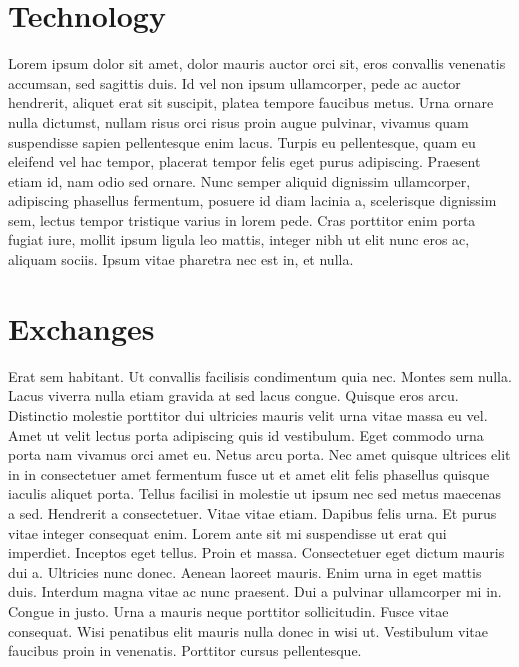 \documentclass[letterpaper,10pt,openany,oneside,english]{sphinxmanual}
\begin{document}
\section{Technology}
\label{\detokenize{technology:technology}}\label{\detokenize{technology::doc}}
Lorem ipsum dolor sit amet, dolor mauris auctor orci sit, eros convallis venenatis accumsan, sed sagittis duis. Id vel non ipsum ullamcorper, pede ac auctor hendrerit, aliquet erat sit suscipit, platea tempore faucibus metus. Urna ornare nulla dictumst, nullam risus orci risus proin augue pulvinar, vivamus quam suspendisse sapien pellentesque enim lacus. Turpis eu pellentesque, quam eu eleifend vel hac tempor, placerat tempor felis eget purus adipiscing. Praesent etiam id, nam odio sed ornare. Nunc semper aliquid dignissim ullamcorper, adipiscing phasellus fermentum, posuere id diam lacinia a, scelerisque dignissim sem, lectus tempor tristique varius in lorem pede. Cras porttitor enim porta fugiat iure, mollit ipsum ligula leo mattis, integer nibh ut elit nunc eros ac, aliquam sociis. Ipsum vitae pharetra nec est in, et nulla.


\section{Exchanges}
\label{\detokenize{exchanges:exchanges}}\label{\detokenize{exchanges::doc}}
Erat sem habitant. Ut convallis facilisis condimentum quia nec. Montes sem nulla. Lacus viverra nulla etiam gravida at sed lacus congue. Quisque eros arcu. Distinctio molestie porttitor dui ultricies mauris velit urna vitae massa eu vel. Amet ut velit lectus porta adipiscing quis id vestibulum. Eget commodo urna porta nam vivamus orci amet eu. Netus arcu porta. Nec amet quisque ultrices elit in in consectetuer amet fermentum fusce ut et amet elit felis phasellus quisque iaculis aliquet porta. Tellus facilisi in molestie ut ipsum nec sed metus maecenas a sed. Hendrerit a consectetuer. Vitae vitae etiam. Dapibus felis urna. Et purus vitae integer consequat enim. Lorem ante sit mi suspendisse ut erat qui imperdiet. Inceptos eget tellus. Proin et massa. Consectetuer eget dictum mauris dui a. Ultricies nunc donec. Aenean laoreet mauris. Enim urna in eget mattis duis. Interdum magna vitae ac nunc praesent. Dui a pulvinar ullamcorper mi in. Congue in justo. Urna a mauris neque porttitor sollicitudin. Fusce vitae consequat. Wisi penatibus elit mauris nulla donec in wisi ut. Vestibulum vitae faucibus proin in venenatis. Porttitor cursus pellentesque.
\end{document}
